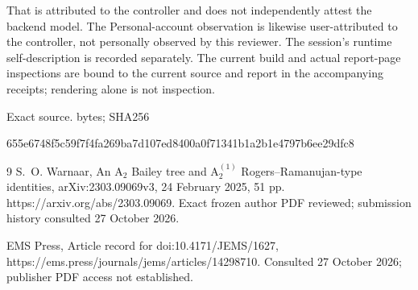 \documentclass[10pt]{article}
\begin{document}
That is attributed to the controller and does not independently attest the backend model. The Personal-account observation is likewise user-attributed to the controller, not personally observed by this reviewer. The session’s runtime self-description is recorded separately. The current build and actual report-page inspections are bound to the current source and report in the accompanying receipts; rendering alone is not inspection.\par
Exact source. bytes; SHA256\par
655e6748f5c59f7f4fa269ba7d107ed8400a0f71341b1a2b1e4797b6ee29dfc8\par
9 S. O. Warnaar, An \(\mathrm A_2\) Bailey tree and \(\mathrm A_2^{(1)}\) Rogers–Ramanujan-type identities, arXiv:2303.09069v3, 24 February 2025, 51 pp. https://arxiv.org/abs/2303.09069. Exact frozen author PDF reviewed; submission history consulted 27 October 2026.\par
EMS Press, Article record for doi:10.4171/JEMS/1627, https://ems.press/journals/jems/articles/14298710. Consulted 27 October 2026; publisher PDF access not established.\par
\end{document}
